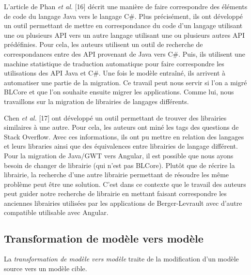 \documentclass[11pt,]{article}
\begin{document}
L'article de Phan \emph{et al.} {[}16{]} décrit une manière de faire
correspondre des éléments de code du langage Java vers le langage C\#.
Plus précisément, ils ont développé un outil permettant de mettre en
correspondance du code d'un langage utilisant une ou plusieurs API vers
un autre langage utilisant une ou plusieurs autres API prédéfinies. Pour
cela, les auteurs utilisent un outil de recherche de correspondances
entre des API provenant de Java vers C\#. Puis, ils utilisent une
machine statistique de traduction automatique pour faire correspondre
les utilisations des API Java et C\#. Une fois le modèle entraîné, ils
arrivent à automatiser une partie de la migration. Ce travail peut nous
servir si l'on a migré BLCore et que l'on souhaite ensuite migrer les
applications. Comme lui, nous travaillons sur la migration de librairies
de langages différents.

Chen \emph{et al.} {[}17{]} ont développé un outil permettant de trouver
des librairies similaires à une autre. Pour cela, les auteurs ont miné
les tags des questions de Stack Overflow. Avec ces informations, ils ont
pu mettre en relation des langages et leurs libraries ainsi que des
équivalences entre librairies de langage différent. Pour la migration de
Java/GWT vers Angular, il est possible que nous ayons besoin de changer
de librairie (qui n'est pas BLCore). Plutôt que de récrire la librairie,
la recherche d'une autre librairie permettant de résoudre les même
problème peut être une solution. C'est dans ce contexte que le travail
des auteurs peut guider notre recherche de librairie en mettant faisant
correspondre les anciennes librairies utilisées par les applications de
Berger-Levrault avec d'autre compatible utilisable avec Angular.

\hypertarget{transformation-de-moduxe8le-vers-moduxe8le}{%
\subsection{Transformation de modèle vers
modèle}\label{transformation-de-moduxe8le-vers-moduxe8le}}

La \emph{transformation de modèle vers modèle} traite de la modification
d'un modèle source vers un modèle cible.
\end{document}

